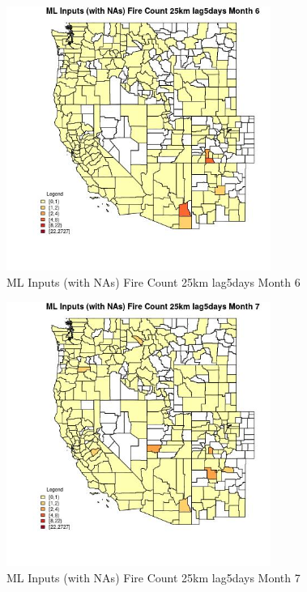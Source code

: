 \begin{figure} 
\centering  
\includegraphics[width=0.77\textwidth]{Code_Outputs/Report_ML_input_PM25_Step4_part_f_de_duplicated_aveswNAs_CountyFire_Count_25km_lag5daysmedianMonth6.jpg} 
\caption{\label{fig:Report_ML_input_PM25_Step4_part_f_de_duplicated_aveswNAsCountyFire_Count_25km_lag5daysmedianMonth6}ML Inputs (with NAs) Fire Count 25km lag5days Month 6} 
\end{figure} 
 

\begin{figure} 
\centering  
\includegraphics[width=0.77\textwidth]{Code_Outputs/Report_ML_input_PM25_Step4_part_f_de_duplicated_aveswNAs_CountyFire_Count_25km_lag5daysmedianMonth7.jpg} 
\caption{\label{fig:Report_ML_input_PM25_Step4_part_f_de_duplicated_aveswNAsCountyFire_Count_25km_lag5daysmedianMonth7}ML Inputs (with NAs) Fire Count 25km lag5days Month 7} 
\end{figure} 
 

